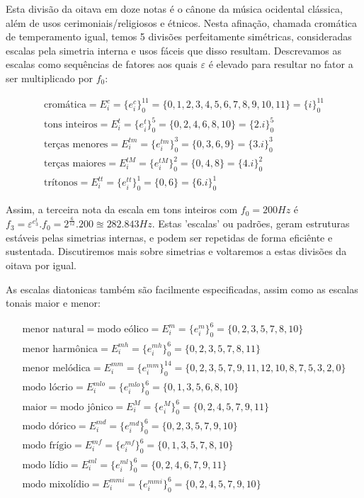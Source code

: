 Esta divisão da oitava em doze notas é o cânone da música ocidental clássica,
além de usos cerimoniais/religiosos e étnicos. Nesta afinação, chamada cromática
de temperamento igual, temos 5 divisões perfeitamente simétricas, consideradas
escalas pela simetria interna e usos fáceis que disso resultam. Descrevamos
as escalas como sequências de fatores aos quais $\varepsilon$ é elevado para resultar
no fator a ser multiplicado por $f_0$:

\begin{equation}
\begin{split}
\text{cromática} = E_i^c = \{e_i^c\}_0^{11} =  \{0,1,2,3,4,5,6,7,8,9,10,11\} = \{i\}_0^{11}\\
\text{tons inteiros} = E_i^t = \{e_i^t\}_0^{5} = \{0,2,4,6,8,10\} = \{2.i\}_0^{5} \\
\text{terças menores} = E_i^{tm} = \{e_i^{tm}\}_0^{3} = \{0,3,6,9\} = \{3.i\}_0^3 \\
\text{terças maiores} = E_i^{tM} = \{e_i^{tM}\}_0^{2} = \{0,4,8\} = \{4.i\}_0^2\\
\text{trítonos} = E_i^{tt} = \{e_i^{tt}\}_0^{1} = \{ 0, 6 \} = \{6.i\}_0^1
\end{split}
\end{equation}

Assim, a terceira nota da escala em tons inteiros com $f_0=200Hz$
é $f_3=\varepsilon^{e_3^t} . f_0 = 2^{\frac{6}{12}} . 200 \approxeq 282.843 Hz$. Estas
'escalas' ou padrões, geram estruturas estáveis pelas simetrias internas, e podem ser
repetidas de forma eficiênte e sustentada. Discutiremos mais sobre simetrias e voltaremos
a estas divisões da oitava por igual.

As escalas diatonicas também são facilmente especificadas, assim como
as escalas tonais maior e menor:


\begin{equation}
\begin{split}
\text{menor natural} = \text{modo eólico} = E_i^m = \{e_i^m\}_0^6 = \{0,2,3,5,7,8,10\} \\
\text{menor harmônica} = E_i^{mh} = \{e_i^{mh}\}_0^6 = \{0,2,3,5,7,8,11\} \\
\text{menor melódica} = E_i^{mm} = \{e_i^{mm}\}_0^{14} = \{0,2,3,5,7,9,11,12,10,8,7,5,3,2,0\} \\
\text{modo lócrio} = E_i^{mlo} = \{e_i^{mlo}\}_0^6 = \{0,1,3,5,6,8,10\} \\ 
\text{maior} = \text{modo jônico} = E_i^M = \{e_i^M\}_0^6 = \{0,2,4,5,7,9,11\} \\
\text{modo dórico} = E_i^{md} = \{e_i^{md}\}_0^6 = \{0,2,3,5,7,9,10\} \\
\text{modo frígio} = E_i^{mf} = \{e_i^{mf}\}_0^6 = \{0,1,3,5,7,8,10\} \\
\text{modo lídio} = E_i^{ml}=\{e_i^{ml}\}_0^6 = \{0,2,4,6,7,9,11\} \\
\text{modo mixolídio} = E_i^{mmi} = \{e_i^{mmi}\}_0^6 = \{0,2,4,5,7,9,10\}
\end{split}
\end{equation}

